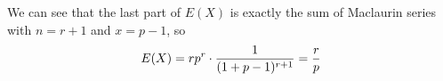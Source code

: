 \documentclass[11pt]{article}
\begin{document}
We can see that the last part of $E(X)$ is exactly the sum of Maclaurin series with $n=r+1$ and $x=p-1$,  so
\[
E(X) = r p^r \cdot \frac{1}{(1 + p -1)^{r+1}} = \frac{r}{p} \\
\]














\clearpage

\printbibliography [title={Reference}]


\end{document}
